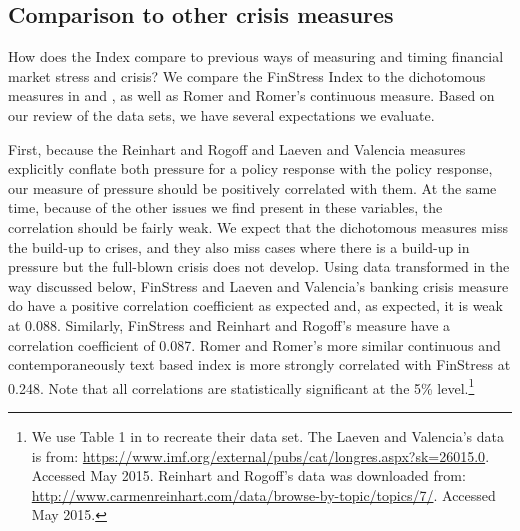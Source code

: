 \documentclass[]{article}
\begin{document}
\subsection{Comparison to other crisis
measures}\label{comparison-to-other-crisis-measures}

How does the Index compare to previous ways of measuring and timing financial market stress and crisis? We compare the FinStress Index to the dichotomous measures in \cite{Reinhart2009} and \cite{laeven2013}, as well as Romer and Romer's \citeyearpar{Romer2015} continuous measure. Based on our review of the data sets, we have several expectations we evaluate.

First, because the Reinhart and Rogoff and Laeven and Valencia measures explicitly conflate both pressure for a policy response with the policy response, our measure of pressure should be positively correlated with them.  At the same time, because of the other issues we find present in these variables, the correlation should be fairly weak. We expect that the dichotomous measures miss the build-up to crises, and they also miss cases where there is a build-up in pressure but the full-blown crisis does not develop. Using data transformed in the way discussed below, FinStress and Laeven and Valencia's banking crisis measure do have a positive correlation coefficient as expected and, as expected, it is weak at 0.088. Similarly, FinStress and Reinhart and Rogoff's measure have a correlation coefficient of 0.087. Romer and Romer's more similar continuous and contemporaneously text based index is more strongly correlated with FinStress at 0.248. Note that all correlations are statistically significant at the 5\% level.\footnote{We use Table 1 in \cite{Romer2015} to recreate their data set. The Laeven and Valencia's data is from: \url{https://www.imf.org/external/pubs/cat/longres.aspx?sk=26015.0}.
  Accessed May 2015. Reinhart and Rogoff's data was downloaded from:
  \url{http://www.carmenreinhart.com/data/browse-by-topic/topics/7/}.
  Accessed May 2015.}

\end{document}
